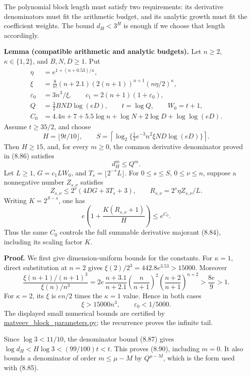 \documentclass[
  11pt,
  a4paper,
]{article}
\begin{document}
The polynomial block length must satisfy two requirements: its
derivative denominators must fit the arithmetic budget, and its analytic
growth must fit the coefficient weights. The bound \(d_H<3^H\) is enough
if we choose that length accordingly.

\textbf{Lemma (compatible arithmetic and analytic budgets).} Let
\(n\ge2\), \(\kappa\in\{1,2\}\), and \(B,N,D\ge1\). Put \[
\begin{aligned}
\eta&=e^{1+(n+0.53)/\kappa},\\
\xi&=\frac8{n!}(n+2.1)(2(n+1))^{n+1}(n\eta/2)^\kappa,\\
\varepsilon_0&=3n^3/\xi,\qquad
c_1=2(n+1)(1+\varepsilon_0),\\
Q&=\tfrac32BND\log(eD),\qquad
t=\log Q,\qquad W_0=t+1,\\
C_0&=4.4n+7+5.5\log n+\log N+2\log D+\log\log(eD).
\end{aligned}
\] Assume \(t\ge35/2\), and choose \[
H=\lfloor9t/10\rfloor,\qquad
S=\left\lceil\log_2\{\tfrac12e^{-3}n^2\xi ND\log(eD)\}\right\rceil.
\] Then \(H\ge15\), and, for every \(m\ge0\), the common derivative
denominator proved in (8.86) satisfies \[
d_H^m\le Q^m.
\tag{8.90}
\] Let \(L\ge1\), \(G=c_1LW_0\), and \(T_s=\lfloor2^{-s}L\rfloor\). For
\(0\le s\le S\), \(0\le\nu\le n\), suppose a nonnegative number
\(Z_{s,\nu}\) satisfies \[
Z_{s,\nu}\le2^\nu(4DG+3T_s+3),\qquad
R_{s,\nu}=2^s\eta Z_{s,\nu}/L.
\] Writing \(K=2^{S-s}\), one has \[
e\left(1+\frac{K(R_{s,\nu}+1)}H\right)\le e^{C_0}.
\tag{8.91}
\] Thus the same \(C_0\) controls the full summable derivative majorant
(8.84), including its scaling factor \(K\).

\textbf{Proof.} We first give dimension-uniform bounds for the
constants. For \(\kappa=1\), direct substitution at \(n=2\) gives
\(\xi(2)/2^3=442.8e^{3.53}>15000\). Moreover \[
\frac{\xi(n+1)/(n+1)^3}{\xi(n)/n^3}
=2e\,\frac{n+3.1}{n+2.1}
\left(\frac n{n+1}\right)^2
\left(\frac{n+2}{n+1}\right)^{n+2}
>\frac{8e}{9}>1.
\] For \(\kappa=2\), its \(\xi\) is \(en/2\) times the \(\kappa=1\)
value. Hence in both cases \[
\xi>15000n^3,\qquad \varepsilon_0<1/5000.
\tag{8.92}
\] The displayed small numerical bounds are certified by
\href{https://kokunoyumeto.github.io/open-math-courses-public/courses/TR-BAKER/verification/matveev_block_parameters.py}{matveev\_block\_parameters.py};
the recurrence proves the infinite tail.

Since \(\log3<11/10\), the denominator bound (8.87) gives
\(\log d_H<H\log3<(99/100)t<t\). This proves (8.90), including \(m=0\).
It also bounds a denominator of order \(m\le\mu-M\) by \(Q^{\mu-M}\),
which is the form used with (8.85).
\end{document}
